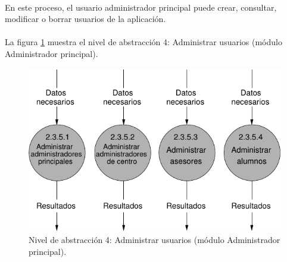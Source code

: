 \paragraph{}En este proceso, el usuario administrador principal puede crear,
consultar, modificar o borrar usuarios de la aplicación.

\paragraph{}La figura \ref{diagramaNivel4-AdministrarUsuarios}
muestra el nivel de abstracción 4: Administrar usuarios (módulo Administrador
principal).

  \begin{figure}[!ht]
    \begin{center}
      \includegraphics[]{08.Analisis_Funcional/8.2.DFDs/Niveles/Nivel4/AdministradorPrincipal/AdministrarUsuarios/Diagramas/nivel4-AdministrarUsuarios.pdf}
      \caption{Nivel de abstracción 4: Administrar usuarios (módulo Administrador
principal).}
      \label{diagramaNivel4-AdministrarUsuarios}
    \end{center}
  \end{figure}
